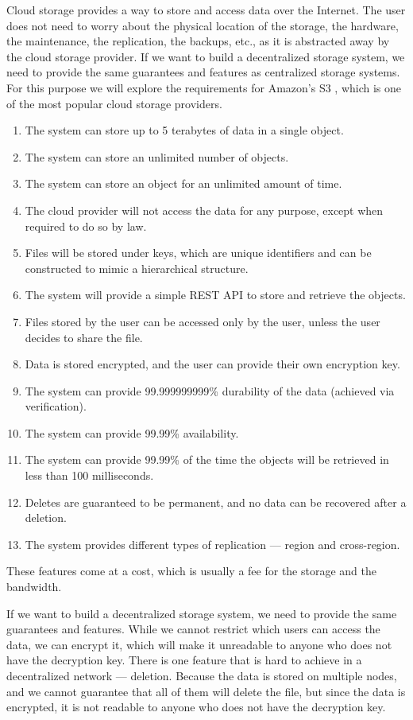 Cloud storage provides a way to store and access data over the Internet.
The user does not need to worry about the physical location of the storage, the hardware, the maintenance,
the replication, the backups, etc., as it is abstracted away by the cloud storage provider.
If we want to build a decentralized storage system, we need to provide the same guarantees and features
as centralized storage systems.
For this purpose we will explore the requirements for Amazon's S3 \cite{s3-faq},
which is one of the most popular cloud storage providers.

\begin{enumerate}
    \item The system can store up to 5 terabytes of data in a single object.
    \item The system can store an unlimited number of objects.
    \item The system can store an object for an unlimited amount of time.
    \item The cloud provider will not access the data for any purpose, except when required to do so by law.
    \item Files will be stored under keys, which are unique identifiers and
        can be constructed to mimic a hierarchical structure.
    \item The system will provide a simple REST API to store and retrieve the objects.
    \item Files stored by the user can be accessed only by the user, unless the user decides to share the file.
    \item Data is stored encrypted, and the user can provide their own encryption key.
    \item The system can provide 99.999999999\% durability of the data (achieved via verification).
    \item The system can provide 99.99\% availability.
    \item The system can provide 99.99\% of the time the objects will be retrieved in less than 100 milliseconds.
    \item Deletes are guaranteed to be permanent, and no data can be recovered after a deletion.
    \item The system provides different types of replication --- region and cross-region.
\end{enumerate}

These features come at a cost, which is usually a fee for the storage and the bandwidth.

If we want to build a decentralized storage system, we need to provide the same guarantees and features.
While we cannot restrict which users can access the data, we can encrypt it,
which will make it unreadable to anyone who does not have the decryption key.
There is one feature that is hard to achieve in a decentralized network --- deletion.
Because the data is stored on multiple nodes, and we cannot guarantee that all of them will delete the file,
but since the data is encrypted, it is not readable to anyone who does not have the decryption key.

